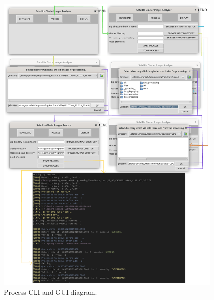 \documentclass[12pt, a4paper]{report}
\begin{document}
	\begin{figure}[H]
		\centering
		\includegraphics[scale=1.5]{process_cmd_gui.png}
		\caption{Process CLI and GUI diagram.}
		\label{fig:process_gui}
	\end{figure}
	
\end{document}
